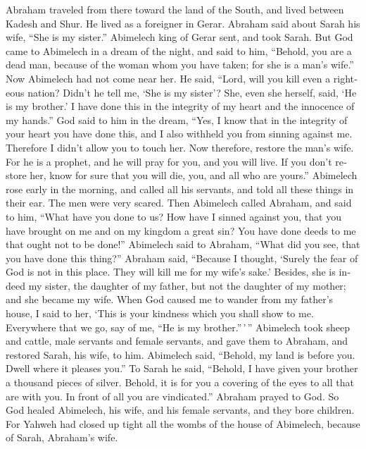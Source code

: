 \begin{paracol}{2}
\begin{otherlanguage}{english}
 Abraham traveled from there toward the land of the South,
and lived between Kadesh and Shur. He lived as a foreigner in Gerar.
 Abraham said about Sarah his wife, ``She is my sister.''
Abimelech king of Gerar sent, and took Sarah.  But God
came to Abimelech in a dream of the night, and said to him, ``Behold,
you are a dead man, because of the woman whom you have taken; for she is
a man's wife.''  Now Abimelech had not come near her. He
said, ``Lord, will you kill even a righteous nation? 
Didn't he tell me, `She is my sister'? She, even she herself, said, `He
is my brother.' I have done this in the integrity of my heart and the
innocence of my hands.''  God said to him in the dream,
``Yes, I know that in the integrity of your heart you have done this,
and I also withheld you from sinning against me. Therefore I didn't
allow you to touch her.  Now therefore, restore the man's
wife. For he is a prophet, and he will pray for you, and you will live.
If you don't restore her, know for sure that you will die, you, and all
who are yours.''  Abimelech rose early in the morning, and
called all his servants, and told all these things in their ear. The men
were very scared.  Then Abimelech called Abraham, and said
to him, ``What have you done to us? How have I sinned against you, that
you have brought on me and on my kingdom a great sin? You have done
deeds to me that ought not to be done!''  Abimelech said
to Abraham, ``What did you see, that you have done this thing?''
 Abraham said, ``Because I thought, `Surely the fear of
God is not in this place. They will kill me for my wife's sake.'
 Besides, she is indeed my sister, the daughter of my
father, but not the daughter of my mother; and she became my wife.
 When God caused me to wander from my father's house, I
said to her, `This is your kindness which you shall show to me.
Everywhere that we go, say of me, ``He is my brother.''\,'\,''
 Abimelech took sheep and cattle, male servants and
female servants, and gave them to Abraham, and restored Sarah, his wife,
to him.  Abimelech said, ``Behold, my land is before you.
Dwell where it pleases you.''  To Sarah he said,
``Behold, I have given your brother a thousand pieces of silver. Behold,
it is for you a covering of the eyes to all that are with you. In front
of all you are vindicated.''  Abraham prayed to God. So
God healed Abimelech, his wife, and his female servants, and they bore
children.  For Yahweh had closed up tight all the wombs
of the house of Abimelech, because of Sarah, Abraham's wife.


\end{otherlanguage}
\end{paracol}
